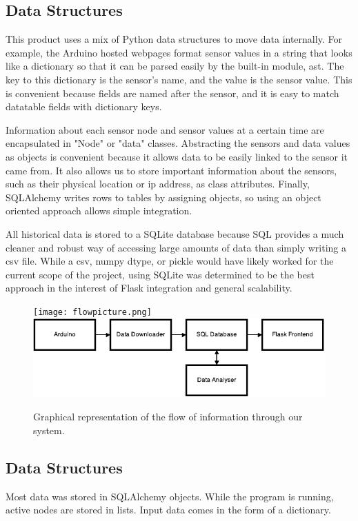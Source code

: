 \documentclass{article}
\begin{document}
\subsection*{Data Structures}
\par This product uses a mix of Python data structures to move data internally. For example, the Arduino hosted webpages format sensor values in a string that looks like a dictionary so that it can be parsed easily by the built-in module, ast.  The key to this dictionary is the sensor's name, and the value is the sensor value. This is convenient because fields are named after the sensor, and it is easy to match datatable fields with dictionary keys.
\par Information about each sensor node and sensor values at a certain time are encapsulated in "Node" or "data" classes.  Abstracting the sensors and data values as objects is convenient because it allows data to be easily linked to the sensor it came from. It also allows us to store important information about the sensors, such as their physical location or ip address, as class attributes. Finally, SQLAlchemy writes rows to tables by assigning objects, so using an object oriented approach allows simple integration.
\par All historical data is stored to a SQLite database because SQL provides a much cleaner and robust way of accessing large amounts of data than simply writing a csv file.  While a csv, numpy dtype, or pickle would have likely worked for the current scope of the project, using SQLite was determined to be the best approach in the interest of Flask integration and general scalability.
\FloatBarrier
\begin{figure}[ht!]
\centering
\texttt{[image: flowpicture.png]}
\includegraphics{flowpicture}
\caption{Graphical representation of the flow of information through our system.}
\FloatBarrier
\end{figure}

\subsection*{Data Structures}
\par Most data was stored in SQLAlchemy objects.  While the program is running, active nodes are stored in lists.  Input data comes in the form of a dictionary.
\end{document}
